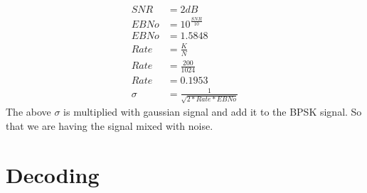 \documentclass[journal,5pt,twocolumn]{IEEEtran}
\begin{document}
\begin{align}
SNR&=2 dB \\
EBNo&=10^\frac{SNR}{10} \\
EBNo&=1.5848 \\
Rate&=\frac{K}{N} \\
Rate&=\frac{200}{1024} \\
Rate&=0.1953\\
\sigma&=\frac{1}{\sqrt{2*Rate*EBNo}}
\end{align}
The above $\sigma$ is multiplied with gaussian signal and add it to the BPSK signal.
So that we are having the signal mixed with noise.

\section{\textbf{Decoding}}
\end{document}
